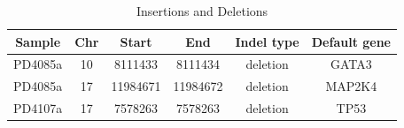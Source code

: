\documentclass[11pt]{amsart}
\theoremstyle{definition}
\begin{document}
\begin{table}
\begin{center}
\begin{tabular}{cccccc}%
  {\bf Sample}& {\bf Chr} & {\bf Start} & {\bf End} & {\bf Indel type} & {\bf Default gene} \\ \hline
  PD4085a& 10 & 8111433  & 8111434  & deletion & GATA3  \\ %
  PD4085a& 17 & 11984671 & 11984672 & deletion & MAP2K4 \\ %
  PD4107a& 17 & 7578263  & 7578263  & deletion & TP53   \\[1em] %
\end{tabular}\caption{Insertions and Deletions}\label{tab:tableB}
\end{center}
\end{table}
\end{document}
